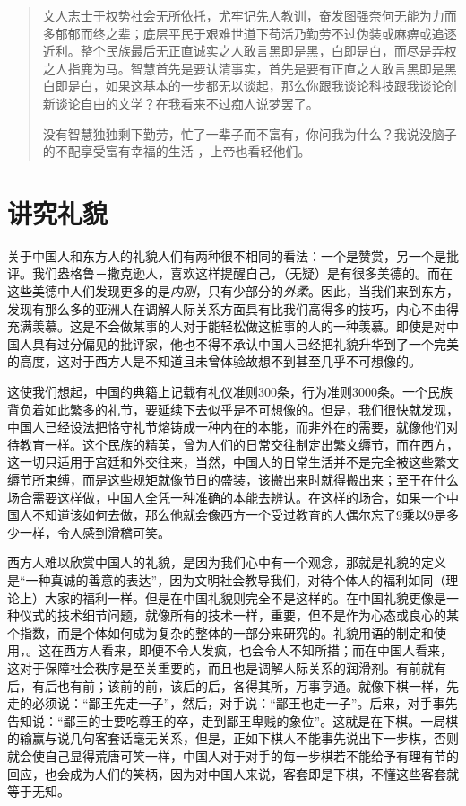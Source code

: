 \documentclass[12pt,oneside]{book}
\begin{document}
\begin{common-format}
\begin{quotation}
文人志士于权势社会无所依托，尤牢记先人教训，奋发图强奈何无能为力而多郁郁而终之辈；底层平民于艰难世道下苟活乃勤劳不过伪装或麻痹或追逐近利。整个民族最后无正直诚实之人敢言黑即是黑，白即是白，而尽是弄权之人指鹿为马。智慧首先是要认清事实，首先是要有正直之人敢言黑即是黑白即是白，如果这基本的一步都无以谈起，那么你跟我谈论科技跟我谈论创新谈论自由的文学？在我看来不过痴人说梦罢了。

没有智慧独独剩下勤劳，忙了一辈子而不富有，你问我为什么？我说没脑子的不配享受富有幸福的生活 ，上帝也看轻他们。
\end{quotation}


\chapter{讲究礼貌}
关于中国人和东方人的礼貌人们有两种很不相同的看法：一个是赞赏，另一个是批评。我们盎格鲁－撒克逊人，喜欢这样提醒自己，（无疑）是有很多美德的。而在这些美德中人们发现更多的是\textit{内刚}，只有少部分的\textit{外柔}。因此，当我们来到东方，发现有那么多的亚洲人在调解人际关系方面具有比我们高得多的技巧，内心不由得充满羡慕。这是不会做某事的人对于能轻松做这桩事的人的一种羡慕。即使是对中国人具有过分偏见的批评家，他也不得不承认中国人已经把礼貌升华到了一个完美的高度，这对于西方人是不知道且未曾体验故想不到甚至几乎不可想像的。 

这使我们想起，中国的典籍上记载有礼仪准则300条，行为准则3000条。一个民族背负着如此繁多的礼节，要延续下去似乎是不可想像的。但是，我们很快就发现，中国人已经设法把恪守礼节熔铸成一种内在的本能，而非外在的需要，就像他们对待教育一样。这个民族的精英，曾为人们的日常交往制定出繁文缛节，而在西方，这一切只适用于宫廷和外交往来，当然，中国人的日常生活并不是完全被这些繁文缛节所束缚，而是这些规矩就像节日的盛装，该搬出来时就得搬出来；至于在什么场合需要这样做，中国人全凭一种准确的本能去辨认。在这样的场合，如果一个中国人不知道该如何去做，那么他就会像西方一个受过教育的人偶尔忘了9乘以9是多少一样，令人感到滑稽可笑。 

西方人难以欣赏中国人的礼貌，是因为我们心中有一个观念，那就是礼貌的定义是“一种真诚的善意的表达”，因为文明社会教导我们，对待个体人的福利如同（理论上）大家的福利一样。但是在中国礼貌则完全不是这样的。在中国礼貌更像是一种仪式的技术细节问题，就像所有的技术一样，重要，但不是作为心态或良心的某个指数，而是个体如何成为复杂的整体的一部分来研究的。礼貌用语的制定和使用，。这在西方人看来，即便不令人发疯，也会令人不知所措；而在中国人看来，这对于保障社会秩序是至关重要的，而且也是调解人际关系的润滑剂。有前就有后，有后也有前；该前的前，该后的后，各得其所，万事亨通。就像下棋一样，先走的必须说：“鄙王先走一子”，然后，对手说：“鄙王也走一子”。后来，对手事先告知说：“鄙王的士要吃尊王的卒，走到鄙王卑贱的象位”。这就是在下棋。一局棋的输赢与说几句客套话毫无关系，但是，正如下棋人不能事先说出下一步棋，否则就会使自己显得荒唐可笑一样，中国人对于对手的每一步棋若不能给予有理有节的回应，也会成为人们的笑柄，因为对中国人来说，客套即是下棋，不懂这些客套就等于无知。 


\end{common-format}
\end{document}
